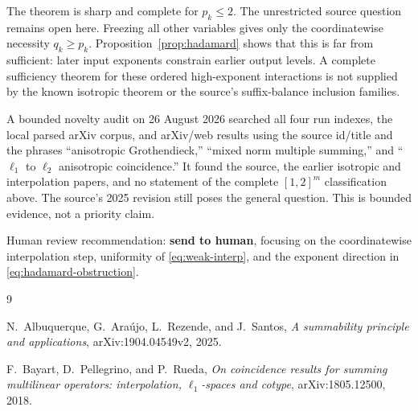 \documentclass[11pt]{article}
\begin{document}
The theorem is sharp and complete for \(p_k\le2\).  The unrestricted source
question remains open here.  Freezing all other variables gives only the
coordinatewise necessity \(q_k\ge p_k\).  Proposition~\ref{prop:hadamard}
shows that this is far from sufficient: later input exponents constrain
earlier output levels.  A complete sufficiency theorem for these ordered
high-exponent interactions is not supplied by the known isotropic theorem or
the source's suffix-balance inclusion families.

A bounded novelty audit on 26 August 2026 searched all four run indexes, the
local parsed arXiv corpus, and arXiv/web results using the source id/title and
the phrases ``anisotropic Grothendieck,'' ``mixed norm multiple summing,''
and ``\(\ell_1\) to \(\ell_2\) anisotropic coincidence.''  It found the
source, the earlier isotropic and interpolation papers, and no statement of
the complete \([1,2]^m\) classification above.  The source's 2025 revision
still poses the general question.  This is bounded evidence, not a priority
claim.

Human review recommendation: \textbf{send to human}, focusing on the
coordinatewise interpolation step, uniformity of \eqref{eq:weak-interp}, and
the exponent direction in \eqref{eq:hadamard-obstruction}.

\enlargethispage{2\baselineskip}
\begin{thebibliography}{9}
\footnotesize
\raggedright
{}
N.~Albuquerque, G.~Ara\'ujo, L.~Rezende, and J.~Santos,
\emph{A summability principle and applications}, arXiv:1904.04549v2, 2025.

F.~Bayart, D.~Pellegrino, and P.~Rueda,
\emph{On coincidence results for summing multilinear operators:
interpolation, \(\ell_1\)-spaces and cotype}, arXiv:1805.12500, 2018.
\end{thebibliography}
\end{document}
